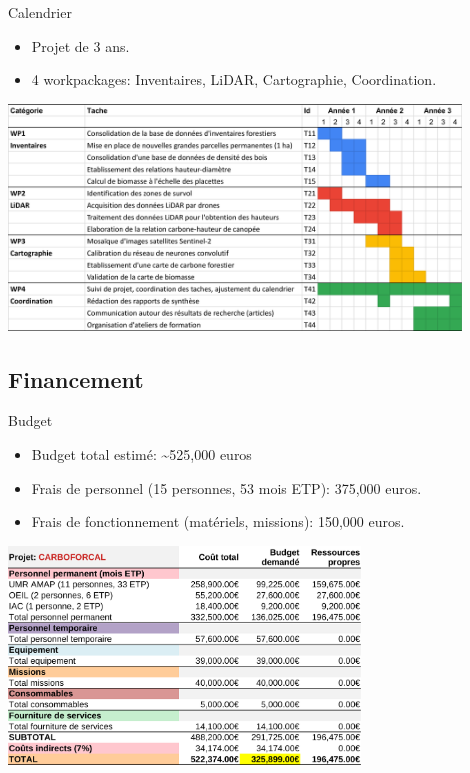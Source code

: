 \documentclass[10pt,table,dvipsnames,compress]{beamer}
\begin{document}
\begin{frame}[label={sec:org0514f05}]{Calendrier}
\begin{itemize}
\item Projet de 3 ans.
\item 4 workpackages: Inventaires, LiDAR, Cartographie, Coordination.
\end{itemize}

\begin{center}
\includegraphics[width=0.9\textwidth]{tabs/diagramme-gantt.png}
\end{center}
\end{frame}

\subsection{Financement}
\label{sec:org6dcac91}

\begin{frame}[label={sec:org69743f7}]{Budget}
\begin{itemize}
\item Budget total estimé: \textasciitilde{}525,000 euros
\item Frais de personnel (15 personnes, 53 mois ETP): 375,000 euros.
\item Frais de fonctionnement (matériels, missions): 150,000 euros.
\end{itemize}

\begin{center}
\includegraphics[width=0.7\textwidth]{tabs/budget_Projet.png}
\end{center}
\end{frame}
\end{document}
